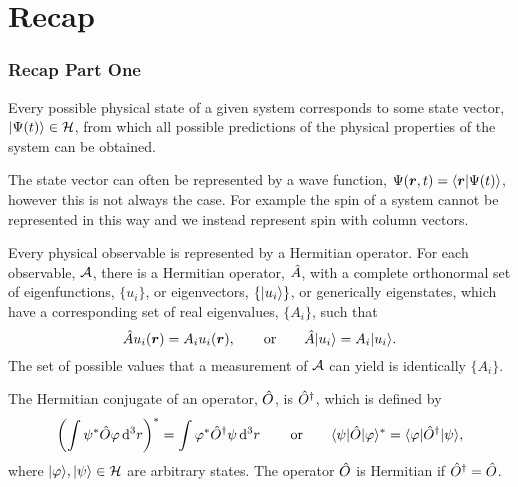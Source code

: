 \part{Recap}
\section{Recap Part One}
\setcounter{postulateCounter}{0}
\begin{postulate}{}{}
    Every possible physical state of a given system corresponds to some state vector, \(\vert {\Psi(t)} \rangle \in \mathcal{H}\), from which all possible predictions of the physical properties of the system can be obtained.
\end{postulate}
The state vector can often be represented by a wave function, \(\Psi(\bm{r}, t) = \langle {\bm{r}} \vert {\Psi(t)} \rangle\), however this is not always the case.
For example the spin of a system cannot be represented in this way and we instead represent spin with column vectors.

\begin{postulate}{}{}
    Every physical observable is represented by a Hermitian operator.
    For each observable, \(\mathcal{A}\), there is a Hermitian operator, \(\hat{A}\), with a complete orthonormal set of eigenfunctions, \(\{u_i\}\), or eigenvectors, \(\{\vert {u_i} \rangle\}\), or generically eigenstates, which have a corresponding set of real eigenvalues, \(\{A_i\}\), such that
    \[\hat{A}u_i(\bm{r}) = A_iu_i(\bm{r}), \qquad\text{or}\qquad \hat{A}\vert {u_i} \rangle = A_i\vert {u_i} \rangle.\]
    The set of possible values that a measurement of \(\mathcal{A}\) can yield is identically \(\{A_i\}\).
\end{postulate}

The Hermitian conjugate of an operator, \(\hat{O}\), is \(\hat{O}^\dagger\), which is defined by
\[\left(\int\psi^*\hat{O}\varphi \dd[3]{r}\right)^* = \int \varphi^*\hat{O}^\dagger\psi\dd[3]{r} \qquad\text{or}\qquad \langle {\psi} \vert\hat{O}\vert {\varphi} \rangle^* = \langle {\varphi} \vert\hat{O}^\dagger\vert {\psi} \rangle,\]
where \(\vert {\varphi} \rangle, \vert {\psi} \rangle\in\mathcal{H}\) are arbitrary states.
The operator \(\hat{O}\) is Hermitian if \(\hat{O}^\dagger = \hat{O}\).

